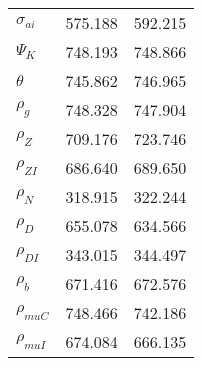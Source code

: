 \begin{center}
\begin{longtable}{lcc}
$ {\sigma_{ai}}        $	 & 	     575.188	 & 	     592.215 \\ 
$ {\Psi_{K}}           $	 & 	     748.193	 & 	     748.866 \\ 
$ {\theta}             $	 & 	     745.862	 & 	     746.965 \\ 
$ {\rho_g}             $	 & 	     748.328	 & 	     747.904 \\ 
$ {\rho_Z}             $	 & 	     709.176	 & 	     723.746 \\ 
$ {\rho_{ZI}}          $	 & 	     686.640	 & 	     689.650 \\ 
$ {\rho_N}             $	 & 	     318.915	 & 	     322.244 \\ 
$ {\rho_D}             $	 & 	     655.078	 & 	     634.566 \\ 
$ {\rho_{DI}}          $	 & 	     343.015	 & 	     344.497 \\ 
$ {\rho_b}             $	 & 	     671.416	 & 	     672.576 \\ 
$ {\rho_{muC}}         $	 & 	     748.466	 & 	     742.186 \\ 
$ {\rho_{muI}}         $	 & 	     674.084	 & 	     666.135 \\ 
\end{longtable}
 \end{center}
